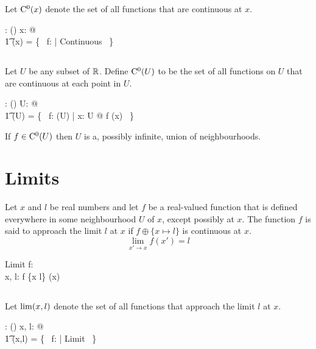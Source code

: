 \documentclass[11pt, oneside]{article}
\begin{document}
Let $\operatorname{C^0}(x)$ denote the set of all functions that are continuous at $x$.
\begin{axdef}
	\CzeroR: \R \fun \power(\R \pfun \R)
\where
	\forall x: \R @ \\
	\t1	\CzeroR(x) = \{~ f: \R \pfun \R | Continuous ~\}
\end{axdef}

\subsection{}

Let $U$ be any subset of $\mathbb{R}$. 
Define $\operatorname{C^0}(U)$ to be the set of all functions on $U$ that are continuous at each point in $U$.

\begin{axdef}
	\CzeroPR: \power \R \fun \power (\R \pfun \R)
\where
	\forall U: \power \R @ \\
	\t1	\CzeroPR(U) = \{~ f: \FunPR(U) | \forall x: U @ f \in   \CzeroR(x) ~\}
\end{axdef}

\begin{remark}
If $f \in \operatorname{C^0}(U)$ then $U$ is a, possibly infinite, union of neighbourhoods.
\end{remark}

\section{Limits}

Let $x$ and $l$ be real numbers and
let $f$ be a real-valued function that is defined everywhere in some
neighbourhood $U$ of $x$, except possibly at $x$.
The function $f$ is said to approach the limit $l$ at $x$ if $f \oplus \{ x \mapsto l \}$ is continuous at $x$.
$$
	\lim_{x' \to x}{f(x')} = l
$$

\begin{schema}{Limit}
	f: \R \pfun \R \\
	x, l: \R
\where
	f \oplus \{x \mapsto l\} \in \CzeroR(x)
\end{schema}

\subsection{}

Let $\operatorname{lim}(x,l)$ denote the set of all functions that approach the limit $l$ at $x$.

\begin{axdef}
	\limRR: \R \cross \R \fun \power(\R \pfun \R)
\where
	\forall x, l: \R @ \\
	\t1	\limRR(x,l) = \{~ f: \R \pfun \R | Limit ~\}
\end{axdef}
\end{document}

